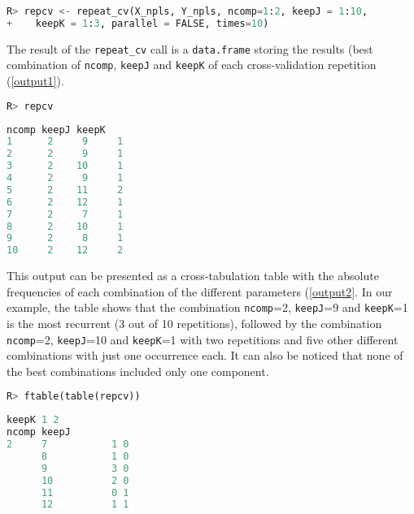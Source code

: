\vspace{15pt}
\begin{lstlisting}[basicstyle=\small, language=Python, deletekeywords={max, scale}, morekeywords={array, matrix, rep, rpois, rnorm, function, repeat_cv}, otherkeywords={}]
R> repcv <- repeat_cv(X_npls, Y_npls, ncomp=1:2, keepJ = 1:10, 
+    keepK = 1:3, parallel = FALSE, times=10)
\end{lstlisting}

The result of the \texttt{repeat\_cv} call is a \texttt{data.frame} storing the results (best combination of \texttt{ncomp}, \texttt{keepJ} and \texttt{keepK} of each cross-validation repetition (\autoref{output1}). 

\vspace{15pt}
\begin{lstlisting}[basicstyle=\small, language=Python]
R> repcv
\end{lstlisting}

\vspace{5pt}
\begin{lstlisting}[basicstyle=\small, backgroundcolor=\color{output}, numbers=none, label={output1}, language=Python, caption=Results of \texttt{repeat\_cv} function.]
   ncomp keepJ keepK
1      2     9     1
2      2     9     1
3      2    10     1
4      2     9     1
5      2    11     2
6      2    12     1
7      2     7     1
8      2    10     1
9      2     8     1
10     2    12     2
\end{lstlisting}

This output can be presented as a cross-tabulation table with the absolute frequencies of each combination of the different parameters (\autoref{output2}. In our example, the table shows that the combination \texttt{ncomp}=2, \texttt{keepJ}=9 and \texttt{keepK}=1 is the most recurrent (3 out of 10 repetitions), followed by the combination \texttt{ncomp}=2, \texttt{keepJ}=10 and \texttt{keepK}=1 with two repetitions and five other different combinations with just one occurrence each. It can also be noticed that none of the best combinations included only one component.

\vspace{15pt}
\begin{lstlisting}[basicstyle=\small, language=Python, deletekeywords={max, scale}, morekeywords={ftable, table}, otherkeywords={}]
R> ftable(table(repcv))
\end{lstlisting}

\begin{lstlisting}[basicstyle=\small, backgroundcolor=\color{output}, numbers=none, label={output2}, language=Python, caption=Cross-tabulation table of the results of \texttt{repeat\_cv}.]
            keepK 1 2
ncomp keepJ          
2     7           1 0
      8           1 0
      9           3 0
      10          2 0
      11          0 1
      12          1 1
\end{lstlisting}

